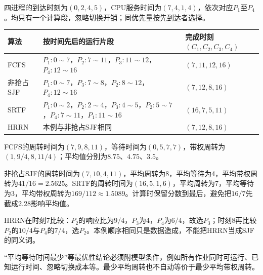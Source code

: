 四进程的到达时刻为\((0,2,4,5)\)，CPU服务时间为\((7,4,1,4)\)，依次对应\(P_1\)至\(P_4\)。均只有一个计算段，忽略切换开销；同优先量按先到达者选择。

\par\medskip\noindent\begin{minipage}{\linewidth}\fontsize{9.3}{12}\selectfont\begin{tabularx}{\linewidth}{@{}YYY@{}}
\toprule\noalign{}
\begin{minipage}[b]{\linewidth}\raggedright
算法
\end{minipage} & \begin{minipage}[b]{\linewidth}\raggedright
按时间先后的运行片段
\end{minipage} & \begin{minipage}[b]{\linewidth}\raggedright
完成时刻\((C_1,C_2,C_3,C_4)\)
\end{minipage} \\
\midrule\noalign{}


FCFS & \(P_1:0\!\sim\!7\)，\(P_2:7\!\sim\!11\)，\(P_3:11\!\sim\!12\)，\(P_4:12\!\sim\!16\) & \((7,11,12,16)\) \\
非抢占SJF & \(P_1:0\!\sim\!7\)，\(P_3:7\!\sim\!8\)，\(P_2:8\!\sim\!12\)，\(P_4:12\!\sim\!16\) & \((7,12,8,16)\) \\
SRTF & \(P_1:0\!\sim\!2\)，\(P_2:2\!\sim\!4\)，\(P_3:4\!\sim\!5\)，\(P_2:5\!\sim\!7\)，\(P_4:7\!\sim\!11\)，\(P_1:11\!\sim\!16\) & \((16,7,5,11)\) \\
HRRN & 本例与非抢占SJF相同 & \((7,12,8,16)\) \\
\bottomrule\end{tabularx}
\end{minipage}\par\medskip

FCFS的周转时间为\((7,9,8,11)\)，等待时间为\((0,5,7,7)\)，带权周转为\((1,9/4,8,11/4)\)；平均值分别为\(8.75\)、\(4.75\)、\(3.5\)。

非抢占SJF的周转时间为\((7,10,4,11)\)，平均周转为8，平均等待为4，平均带权周转为\(41/16=2.5625\)。SRTF的周转时间为\((16,5,1,6)\)，平均周转为7，平均等待为3，平均带权周转为\(169/112\approx1.5089\)。计算时保留分数到最后，避免把\(16/7\)先截成2.28影响平均值。

HRRN在时刻7比较：\(P_2\)的响应比为\(9/4\)，\(P_3\)为4，\(P_4\)为\(6/4\)，故选\(P_3\)；时刻8再比较\(P_2\)的\(10/4\)与\(P_4\)的\(7/4\)，选\(P_2\)。本例顺序相同只是数据造成，不能把HRRN当成SJF的同义词。

``平均等待时间最少''等最优性结论必须附模型条件，例如所有作业同时可运行、已知运行时间、忽略切换成本等。最少平均周转也不自动等价于最少平均带权周转。

